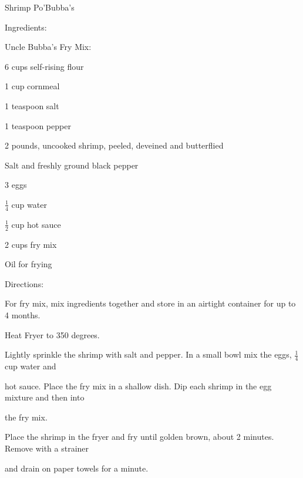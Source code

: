 \documentclass[a4paper,portrait,12pt]{book}
\begin{document}
\newpage
Shrimp Po'Bubba's




Ingredients:




Uncle Bubba's Fry Mix:




6 cups self-rising flour




1 cup cornmeal




1 teaspoon salt




1 teaspoon pepper




2 pounds, uncooked shrimp, peeled, deveined and butterflied




Salt and freshly ground black pepper




3 eggs




$\frac{1}{4}$ cup water




$\frac{1}{2}$ cup hot sauce




2 cups fry mix




Oil for frying




Directions:




For fry mix, mix ingredients together and store in an airtight container for up to 4 months.




Heat Fryer to 350 degrees.




Lightly sprinkle the shrimp with salt and pepper. In a small bowl mix the eggs, $\frac{1}{4}$ cup water and




hot sauce. Place the fry mix in a shallow dish. Dip each shrimp in the egg mixture and then into




the fry mix.




Place the shrimp in the fryer and fry until golden brown, about 2 minutes. Remove with a strainer




and drain on paper towels for a minute.
\end{document}
